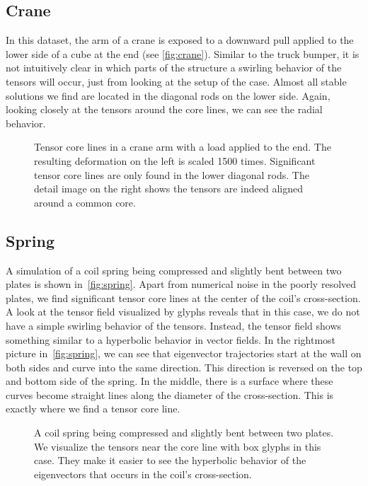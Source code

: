 \subsection{Crane} %
\label{sub:crane}
%
In this dataset, the arm of a crane is exposed to a downward pull applied to
the lower side of a cube at the end (see \autoref{fig:crane}).
%
Similar to the truck bumper, it is not intuitively clear in which parts of the
structure a swirling behavior of the tensors will occur, just from looking at
the setup of the case.
%
Almost all stable solutions we find are located in the diagonal rods on the
lower side.
%
Again, looking closely at the tensors around the core lines, we can see the
radial behavior.
%
\begin{figure}
    \centering
    \setlength\figurewidth\linewidth
    
    \caption{Tensor core lines in a crane arm with a load applied to the end.
             The resulting deformation on the left is scaled 1500 times.
             Significant tensor core lines are only found in the lower diagonal
             rods. The detail image on the right shows the tensors are indeed
             aligned around a common core.}
    \label{fig:crane}
\end{figure}
%
%
\subsection{Spring} %
\label{sub:spring}
%
A simulation of a coil spring being compressed and slightly bent between two
plates is shown in~\autoref{fig:spring}.
%
Apart from numerical noise in the poorly resolved plates, we find significant
tensor core lines at the center of the coil's cross-section.
%
A look at the tensor field visualized by glyphs reveals that in this case, we
do not have a simple swirling behavior of the tensors.
%
Instead, the tensor field shows something similar to a hyperbolic behavior in
vector fields.
%
In the rightmost picture in~\autoref{fig:spring}, we can see that eigenvector
trajectories start at the wall on both sides and curve into the same direction.
%
This direction is reversed on the top and bottom side of the spring.
%
In the middle, there is a surface where these curves become straight lines along
the diameter of the cross-section.
%
This is exactly where we find a tensor core line.
%
\begin{figure}[t]
    \centering
    \setlength\figurewidth\linewidth
    
    \caption{A coil spring being compressed and slightly bent between two
             plates. We visualize the tensors near the core line with box glyphs
             in this case. They make it easier to see the hyperbolic behavior of
             the eigenvectors that occurs in the coil's cross-section. }
    \label{fig:spring}
\end{figure}
%
%
